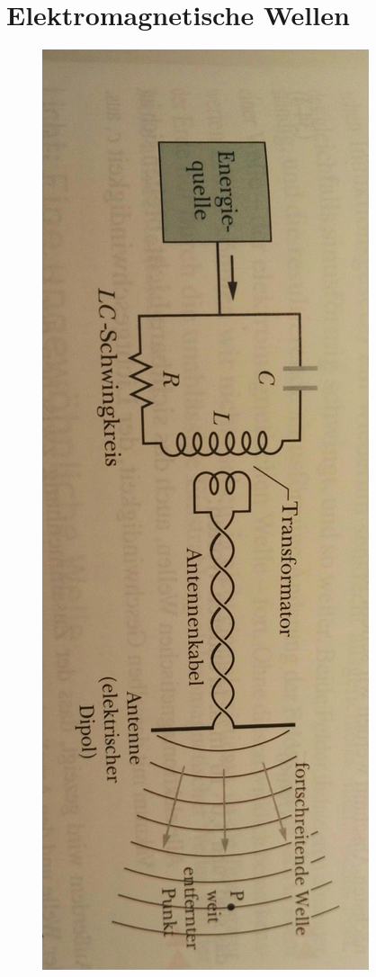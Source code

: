 \section{Elektromagnetische Wellen}
\label{sec:em_wellen}
\begin{figure}
 \centering
 \includegraphics[width=.5\textwidth]{media/em_wellen_erzeugung.pdf}
 \label{fig:em_wellen_erzeugung}
\end{figure}
